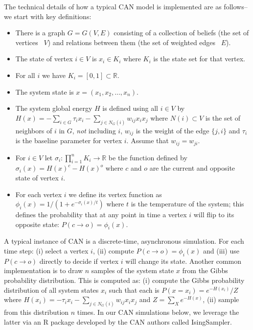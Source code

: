 \documentclass[10pt,letterpaper]{article}
\begin{document}
The technical details of how a typical CAN model is implemented are as follows--we start with key definitions:  

\begin{itemize}
\item There is a graph $G = G(V,E)$ consisting of a collection of beliefs (the set of vertices ~$V$) and relations between them (the set of weighted edges ~$E$).
\item The state of vertex $i\in V$ is $x_i \in K_i$ where $K_i$ is the state set for that vertex. 
\item For all $i$ we have $K_i = [0,1]\subset\mathbb{R}$.
\item The system state is $x = (x_1, x_2, \ldots, x_n)$.
\item The system global energy $H$ is defined using all $i \in V$ by $H(x) = 
-\sum_{i \in G} \tau_i x_i - \sum_{j\in N_G(i)} w_{ij} x_i x_j$ where $N(i) \subset V$ is the set of neighbors of $i$ in $G$, \emph{not} including $i$, $w_{ij}$ is the weight of the edge $\{j,i\}$ and $\tau_i$ is the baseline parameter for vertex $i$.  Assume that $w_{ij} = w_{ji}$.
\item For $i\in V$ let $\sigma_i \colon \prod_{i=1}^n K_i \longrightarrow \mathbb{R}$ be the function defined by $\sigma_i(x) = H(x)^c - H(x)^o$ where $c$ and $o$ are the current and opposite state of vertex $i$.
\item For each vertex $i$ we define its vertex function as $\phi_i(x) = 1/(1+e^{-\sigma_i(x)/t})$ where $t$ is the temperature of the system; this defines the probability that at any point in time a vertex $i$ will flip to its opposite state: $P(c \longrightarrow o) = \phi_i(x)$. 
\end{itemize}

A typical instance of CAN is a discrete-time, asynchronous simulation.  For each time step: (i) select a vertex $i$, (ii) compute $P(c \longrightarrow o) = \phi_i(x)$ and (iii) use $P(c \longrightarrow o)$ directly to decide if vertex $i$ will change its state.  Another common implementation is to draw $n$ samples of the system state $x$ from the Gibbs probability distribution. This is computed as: (i) compute the Gibbs probability distribution of all system states $x_i$ such that each is $P(x = x_i) = e^{-H(x_i)}/Z$ where $H(x_i) = 
-\tau_i x_i - \sum_{j\in N_G(i)} w_{ij} x_i x_j$ and $Z = \sum_{X} e^{-H(x)}$, (ii) sample from this distribution $n$ times.  In our CAN simulations below, we leverage the latter via an R package developed by the CAN authors called IsingSampler.
\end{document}
